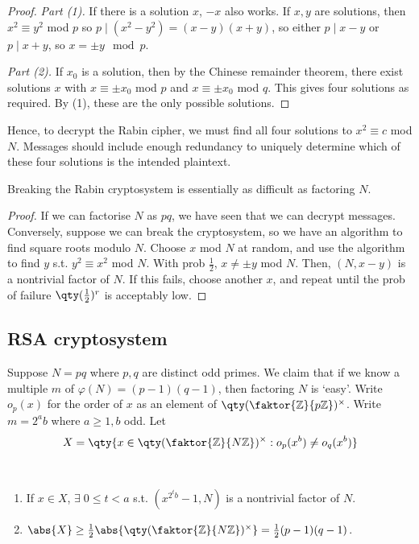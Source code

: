 \begin{proof}
    \emph{Part (1).}
    If there is a solution $x$, $-x$ also works.
    If $x, y$ are solutions, then $x^2 \equiv y^2$ mod $p$ so $p \mid (x^2 - y^2) = (x-y)(x+y)$, so either $p \mid x-y$ or $p \mid x+y$, so $x = \pm y \mod p$.

    \emph{Part (2).}
    If $x_0$ is a solution, then by the Chinese remainder theorem, there exist solutions $x$ with $x \equiv \pm x_0$ mod $p$ and $x \equiv \pm x_0$ mod $q$.
    This gives four solutions as required.
    By (1), these are the only possible solutions.
\end{proof}

Hence, to decrypt the Rabin cipher, we must find all four solutions to $x^2 \equiv c$ mod $N$.
Messages should include enough redundancy to uniquely determine which of these four solutions is the intended plaintext.

\begin{theorem}
    Breaking the Rabin cryptosystem is essentially as difficult as factoring $N$.
\end{theorem}

\begin{proof}
    If we can factorise $N$ as $pq$, we have seen that we can decrypt messages.
    Conversely, suppose we can break the cryptosystem, so we have an algorithm to find square roots modulo $N$.
    Choose $x$ mod $N$ at random, and use the algorithm to find $y$ s.t. $y^2 \equiv x^2$ mod $N$.
    With prob $\frac{1}{2}$, $x \neq \pm y$ mod $N$.
    Then, $(N, x-y)$ is a nontrivial factor of $N$.
    If this fails, choose another $x$, and repeat until the prob of failure $\qty(\frac{1}{2})^r$ is acceptably low.
\end{proof}

\subsection{RSA cryptosystem}
Suppose $N = pq$ where $p, q$ are distinct odd primes.
We claim that if we know a multiple $m$ of $\varphi(N) = (p-1)(q-1)$, then factoring $N$ is `easy'.
Write $o_p(x)$ for the order of $x$ as an element of $\qty(\faktor{\mathbb Z}{p\mathbb Z})^\times$.
Write $m = 2^a b$ where $a \geq 1, b$ odd.
Let
\begin{align*}
    X = \qty{x \in \qty(\faktor{\mathbb Z}{N\mathbb Z})^\times : o_p(x^b) \neq o_q(x^b)}
\end{align*}

\begin{theorem} ~\vspace*{-1.5\baselineskip}
    \begin{enumerate}
        \item If $x \in X$, $\exists \; 0 \leq t < a$ s.t. $(x^{2^t b} - 1, N)$ is a nontrivial factor of $N$.
        \item $\abs{X} \geq \frac{1}{2} \abs{\qty(\faktor{\mathbb Z}{N\mathbb Z})^\times} = \frac{1}{2}(p-1)(q-1)$.
    \end{enumerate}
\end{theorem}

